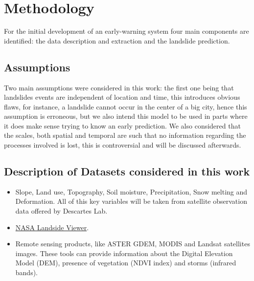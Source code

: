 \documentclass[sigconf, nonacm]{acmart}
\begin{document}

\section{Methodology}

For the initial development of an early-warning system four main components are identified: the data description and extraction and the landslide prediction. %

\subsection{Assumptions}

Two main assumptions were considered in this work: the first one being that landslides events are independent of location and time, this introduces obvious flaws, for instance, a landslide cannot occur in the center of a big city, hence this assumption is erroneous, but we also intend this model to be used in parts where it does make sense trying to know an early prediction. We also considered that the scales, both spatial and temporal are such that no information regarding the processes involved is lost, this is controversial and will be discussed afterwards.


\subsection{Description of Datasets considered in this work} \label{ss:datasets-considered}



\begin{itemize}
    \item Slope, Land use, Topography, Soil moisture, Precipitation, Snow melting and Deformation. All of this key variables will be taken from satellite observation data offered by Descartes Lab.
    \item \href{https://maps.nccs.nasa.gov/arcgis/apps/webappviewer/index.html?id=824ea5864ec8423fb985b33ee6bc05b7}{NASA Landside Viewer}.
    \item Remote sensing products, like ASTER GDEM, MODIS and Landsat satellites images. These tools can provide information about the Digital Elevation Model (DEM), presence of vegetation (NDVI index) and storms (infrared bands).
\end{itemize}
\end{document}
